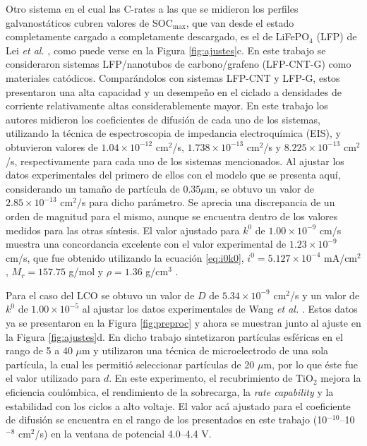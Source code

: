 Otro sistema en el cual las C-rates a las que se midieron los perfiles 
galvanostáticos cubren valores de SOC$_{\max}$, que van desde el estado completamente cargado
a completamente descargado, es el de LiFePO$_4$ (LFP) de Lei \textit{et al.} 
\cite{lei2015}, como puede verse en la Figura \ref{fig:ajustes}c. En este trabajo 
se consideraron sistemas LFP/nanotubos de carbono/grafeno (LFP-CNT-G) como 
materiales catódicos. Comparándolos con sistemas LFP-CNT y LFP-G, estos 
presentaron una alta capacidad y un desempeño en el ciclado a densidades de 
corriente relativamente altas considerablemente mayor.
En este trabajo los autores midieron 
los coeficientes de difusión de cada uno de los sistemas, utilizando la técnica de 
espectroscopia de impedancia electroquímica (EIS), y obtuvieron valores de 
$1.04\times10^{-12}$ cm$^2$/s, $1.738\times10^{-13}$ cm$^2$/s y 
$8.225\times10^{-13}$ cm$^2$/s, respectivamente para cada uno de los sistemas 
mencionados. Al ajustar los datos experimentales del primero de ellos
con el modelo que se presenta aquí, considerando un tamaño de partícula de 
$0.35 \mu$m, se obtuvo un valor de $2.85\times10^{-13}$ cm$^2$/s para dicho 
parámetro. Se aprecia una discrepancia de un orden de magnitud para el mismo, 
aunque se encuentra dentro de los valores medidos para las otras síntesis. 
El valor ajustado para $k^0$ de $1.00\times10^{-9}$ cm/s muestra una
concordancia excelente con el valor experimental de $1.23\times10^{-9}$ cm/s, que
fue obtenido utilizando la ecuación \ref{eq:i0k0}, 
$i^0=5.127\times10^{-4}$ mA/cm$^2$, $M_r = 157.75$ g/mol y 
$\rho = 1.36$ g/cm$^3$ \cite{jin2018}.

Para el caso del LCO se obtuvo un valor de $D$ de $5.34\times10^{-9}$ cm$^2$/s y
un valor de $k^0$ de $1.00\times10^{-5}$ al ajustar los datos experimentales 
de Wang \textit{et al.} \cite{wang2019high}. Estos datos ya se presentaron en la Figura \ref{fig:preproc} y ahora se muestran junto al ajuste en la Figura \ref{fig:ajustes}d.
En dicho trabajo sintetizaron partículas esféricas en el rango
de 5 a 40 $\mu$m y utilizaron una técnica de microelectrodo de una sola partícula,
la cual les permitió seleccionar partículas de 20 $\mu$m, por lo que éste fue el
valor utilizado para $d$. En este experimento, el recubrimiento de TiO$_2$ mejora 
la eficiencia coulómbica, el rendimiento de la sobrecarga, la 
\textit{rate capability} y la estabilidad con los ciclos a alto voltaje. El valor 
acá ajustado para el coeficiente de difusión se encuentra en el rango de los 
presentados en este trabajo (10$^{-10}$--10$^{-8}$ cm$^2$/s) en la ventana de potencial
4.0--4.4 V.

